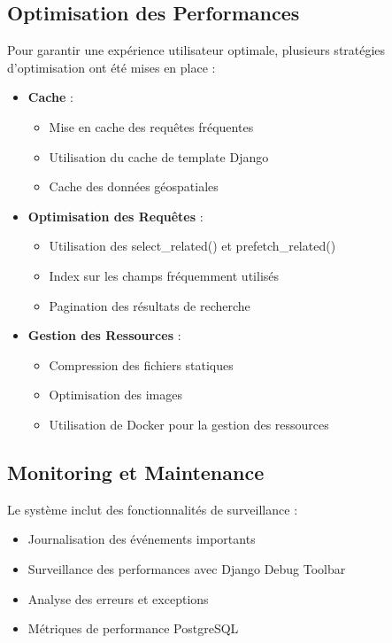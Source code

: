 \subsection{Optimisation des Performances}
Pour garantir une expérience utilisateur optimale, plusieurs stratégies d'optimisation ont été mises en place :

\begin{itemize}
    \item \textbf{Cache} :
    \begin{itemize}
        \item Mise en cache des requêtes fréquentes
        \item Utilisation du cache de template Django
        \item Cache des données géospatiales
    \end{itemize}
    
    \item \textbf{Optimisation des Requêtes} :
    \begin{itemize}
        \item Utilisation des select\_related() et prefetch\_related()
        \item Index sur les champs fréquemment utilisés
        \item Pagination des résultats de recherche
    \end{itemize}
    
    \item \textbf{Gestion des Ressources} :
    \begin{itemize}
        \item Compression des fichiers statiques
        \item Optimisation des images
        \item Utilisation de Docker pour la gestion des ressources
    \end{itemize}
\end{itemize}

\subsection{Monitoring et Maintenance}
Le système inclut des fonctionnalités de surveillance :

\begin{itemize}
    \item Journalisation des événements importants
    \item Surveillance des performances avec Django Debug Toolbar
    \item Analyse des erreurs et exceptions
    \item Métriques de performance PostgreSQL
\end{itemize}


